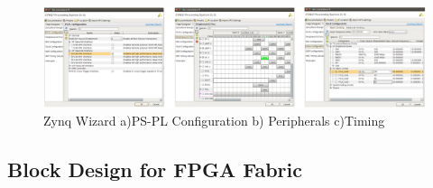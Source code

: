 \documentclass{article}
\begin{document}
\begin{enumerate}
\begin{figure}[h!]
    \centering
    \includegraphics[width=\textwidth]{img/04_wizzard_zynq.png}
    \caption{Zynq Wizard a)PS-PL Configuration b) Peripherals c)Timing }
    \label{fig:Zynq_Wizard}
\end{figure}



\end{enumerate}




\subsection{Block Design for FPGA Fabric}
\end{document}
